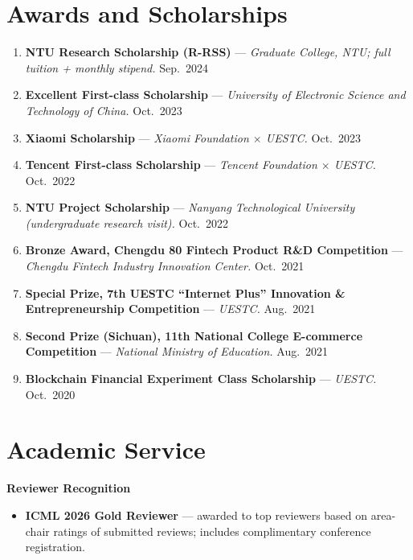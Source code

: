 \documentclass[10pt,a4paper]{article}
\begin{document}
\section*{Awards and Scholarships}

\begin{enumerate}[leftmargin=1.6em]
  \item \textbf{NTU Research Scholarship (R-RSS)} --- \textit{Graduate College, NTU; full tuition + monthly stipend.} \hfill Sep.~2024
  \item \textbf{Excellent First-class Scholarship} --- \textit{University of Electronic Science and Technology of China.} \hfill Oct.~2023
  \item \textbf{Xiaomi Scholarship} --- \textit{Xiaomi Foundation $\times$ UESTC.} \hfill Oct.~2023
  \item \textbf{Tencent First-class Scholarship} --- \textit{Tencent Foundation $\times$ UESTC.} \hfill Oct.~2022
  \item \textbf{NTU Project Scholarship} --- \textit{Nanyang Technological University (undergraduate research visit).} \hfill Oct.~2022
  \item \textbf{Bronze Award, Chengdu 80 Fintech Product R\&D Competition} --- \textit{Chengdu Fintech Industry Innovation Center.} \hfill Oct.~2021
  \item \textbf{Special Prize, 7th UESTC ``Internet Plus'' Innovation \& Entrepreneurship Competition} --- \textit{UESTC.} \hfill Aug.~2021
  \item \textbf{Second Prize (Sichuan), 11th National College E-commerce Competition} --- \textit{National Ministry of Education.} \hfill Aug.~2021
  \item \textbf{Blockchain Financial Experiment Class Scholarship} --- \textit{UESTC.} \hfill Oct.~2020
\end{enumerate}

\section*{Academic Service}

\noindent\textbf{Reviewer Recognition}
\begin{itemize}
  \item \textbf{ICML 2026 Gold Reviewer} --- awarded to top reviewers based on area-chair ratings of submitted reviews; includes complimentary conference registration.
\end{itemize}
\end{document}
